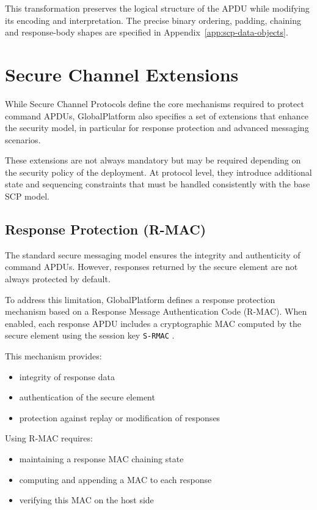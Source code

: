 This transformation preserves the logical structure of the APDU while modifying
its encoding and interpretation.
The precise binary ordering, padding, chaining and response-body shapes are
specified in Appendix~\ref{app:scp-data-objects}.

\section{Secure Channel Extensions}

While Secure Channel Protocols define the core mechanisms required to protect
command APDUs, GlobalPlatform also specifies a set of extensions that enhance
the security model, in particular for response protection and advanced
messaging scenarios.

These extensions are not always mandatory but may be required depending on the
security policy of the deployment. At protocol level, they introduce additional
state and sequencing constraints that must be handled consistently with the
base SCP model.

\subsection{Response Protection (R-MAC)}

The standard secure messaging model ensures the integrity and authenticity of
command APDUs.  However, responses returned by the secure element are not always
protected by default.

To address this limitation, GlobalPlatform defines a response protection
mechanism based on a Response Message Authentication Code (R-MAC). When
enabled, each response APDU includes a cryptographic MAC computed by the secure element
using the session key \texttt{S-RMAC} .

This mechanism provides:
\begin{itemize}
\item integrity of response data
\item authentication of the secure element
\item protection against replay or modification of responses
\end{itemize}

Using R-MAC requires:
\begin{itemize}
\item maintaining a response MAC chaining state
\item computing and appending a MAC to each response
\item verifying this MAC on the host side
\end{itemize}

